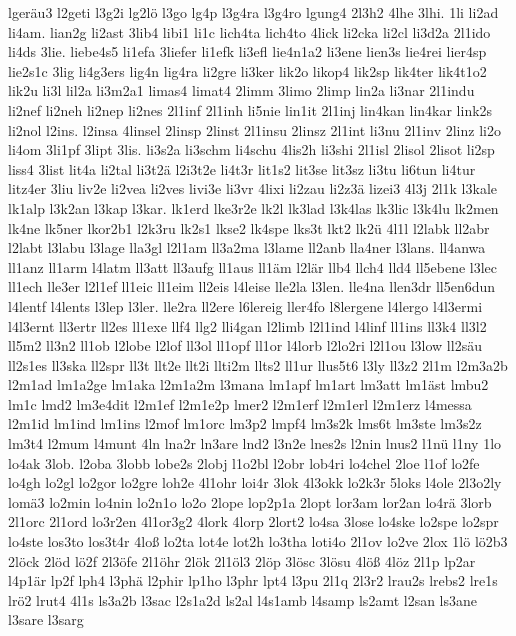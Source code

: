 {lgeräu3
l2geti
l3g2i
lg2lö
l3go
lg4p
l3g4ra
l3g4ro
lgung4
2l3h2
4lhe
3lhi.
1li
li2ad
li4am.
lian2g
li2ast
3lib4
libi1
li1c
lich4ta
lich4to
4lick
li2cka
li2cl
li3d2a
2l1ido
li4ds
3lie.
liebe4s5
li1efa
3liefer
li1efk
li3efl
lie4n1a2
li3ene
lien3s
lie4rei
lier4sp
lie2s1c
3lig
li4g3ers
lig4n
lig4ra
li2gre
li3ker
lik2o
likop4
lik2sp
lik4ter
lik4t1o2
lik2u
li3l
lil2a
li3m2a1
limas4
limat4
2limm
3limo
2limp
lin2a
li3nar
2l1indu
li2nef
li2neh
li2nep
li2nes
2l1inf
2l1inh
li5nie
lin1it
2l1inj
lin4kan
lin4kar
link2s
li2nol
l2ins.
l2insa
4linsel
2linsp
2linst
2l1insu
2linsz
2l1int
li3nu
2l1inv
2linz
li2o
li4om
3li1pf
3lipt
3lis.
li3s2a
li3schm
li4schu
4lis2h
li3shi
2l1isl
2lisol
2lisot
li2sp
liss4
3list
lit4a
li2tal
li3t2ä
l2i3t2e
li4t3r
lit1s2
lit3se
lit3sz
li3tu
li6tun
li4tur
litz4er
3liu
liv2e
li2vea
li2ves
livi3e
li3vr
4lixi
li2zau
li2z3ä
lizei3
4l3j
2l1k
l3kale
lk1alp
l3k2an
l3kap
l3kar.
lk1erd
lke3r2e
lk2l
lk3lad
l3k4las
lk3lic
l3k4lu
lk2men
lk4ne
lk5ner
lkor2b1
l2k3ru
lk2s1
lkse2
lk4spe
lks3t
lkt2
lk2ü
4l1l
l2labk
ll2abr
l2labt
l3labu
l3lage
lla3gl
l2l1am
ll3a2ma
l3lame
ll2anb
lla4ner
l3lans.
ll4anwa
ll1anz
ll1arm
l4latm
ll3att
ll3aufg
ll1aus
ll1äm
l2lär
llb4
llch4
lld4
ll5ebene
l3lec
ll1ech
lle3er
l2l1ef
ll1eic
ll1eim
ll2eis
l4leise
lle2la
l3len.
lle4na
llen3dr
ll5en6dun
l4lentf
l4lents
l3lep
l3ler.
lle2ra
ll2ere
l6lereig
ller4fo
l8lergene
l4lergo
l4l3ermi
l4l3ernt
ll3ertr
ll2es
ll1exe
llf4
llg2
lli4gan
l2limb
l2l1ind
l4linf
ll1ins
ll3k4
ll3l2
ll5m2
ll3n2
ll1ob
l2lobe
l2lof
ll3ol
ll1opf
ll1or
l4lorb
l2lo2ri
l2l1ou
l3low
ll2säu
ll2s1es
ll3ska
ll2spr
ll3t
llt2e
llt2i
llti2m
llts2
ll1ur
llus5t6
l3ly
ll3z2
2l1m
l2m3a2b
l2m1ad
lm1a2ge
lm1aka
l2m1a2m
l3mana
lm1apf
lm1art
lm3att
lm1äst
lmbu2
lm1c
lmd2
lm3e4dit
l2m1ef
l2m1e2p
lmer2
l2m1erf
l2m1erl
l2m1erz
l4messa
l2m1id
lm1ind
lm1ins
l2mof
lm1orc
lm3p2
lmpf4
lm3s2k
lms6t
lm3ste
lm3s2z
lm3t4
l2mum
l4munt
4ln
lna2r
ln3are
lnd2
l3n2e
lnes2s
l2nin
lnus2
l1nü
l1ny
1lo
lo4ak
3lob.
l2oba
3lobb
lobe2s
2lobj
l1o2bl
l2obr
lob4ri
lo4chel
2loe
l1of
lo2fe
lo4gh
lo2gl
lo2gor
lo2gre
loh2e
4l1ohr
loi4r
3lok
4l3okk
lo2k3r
5loks
l4ole
2l3o2ly
lomä3
lo2min
lo4nin
lo2n1o
lo2o
2lope
lop2p1a
2lopt
lor3am
lor2an
lo4rä
3lorb
2l1orc
2l1ord
lo3r2en
4l1or3g2
4lork
4lorp
2lort2
lo4sa
3lose
lo4ske
lo2spe
lo2spr
lo4ste
los3to
los3t4r
4loß
lo2ta
lot4e
lot2h
lo3tha
loti4o
2l1ov
lo2ve
2lox
1lö
lö2b3
2löck
2löd
lö2f
2l3öfe
2l1öhr
2lök
2l1öl3
2löp
3lösc
3lösu
4löß
4löz
2l1p
lp2ar
l4p1är
lp2f
lph4
l3phä
l2phir
lp1ho
l3phr
lpt4
l3pu
2l1q
2l3r2
lrau2s
lrebs2
lre1s
lrö2
lrut4
4l1s
ls3a2b
l3sac
l2s1a2d
ls2al
l4s1amb
l4samp
ls2amt
l2san
ls3ane
l3sare
l3sarg
}
